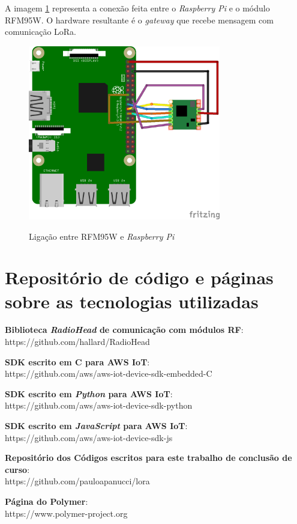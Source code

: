 \documentclass[
    hidelinks,
	12pt,				%
	openany,
	oneside, 
	a4paper,			%
	english,			%
	french,				%
	spanish,			%
	brazil				%
	]{abntex2}
\begin{document}
\begin{anexosenv}
A imagem \ref{fig:rpiwire} representa a conexão feita entre o \textit{Raspberry Pi} e o  módulo RFM95W. O hardware resultante é o \textit{gateway} que recebe mensagem com comunicação LoRa.
\begin{figure}[ht]
    \centering
    \caption{Ligação entre RFM95W e \textit{Raspberry Pi}}
    \includegraphics[width=0.75\textwidth]{rpiwire.png}
    \label{fig:rpiwire}
\end{figure}

\chapter{Repositório de código e páginas sobre as tecnologias utilizadas} \label{anexosoftware}

\textbf{Biblioteca \textit{RadioHead} de comunicação com módulos RF}: 
\\
https://github.com/hallard/RadioHead

\textbf{SDK escrito em C para AWS IoT}: 
\\
https://github.com/aws/aws-iot-device-sdk-embedded-C

\textbf{SDK escrito em \textit{Python} para AWS IoT}:  
\\
https://github.com/aws/aws-iot-device-sdk-python

\textbf{SDK escrito em \textit{JavaScript} para AWS IoT}:  
\\
https://github.com/aws/aws-iot-device-sdk-js

\textbf{Repositório dos Códigos escritos para este trabalho de conclusão de curso}:
\\
https://github.com/pauloapanucci/lora

\textbf{Página do Polymer}: 
\\
https://www.polymer-project.org



\end{anexosenv}
%
\end{document}
